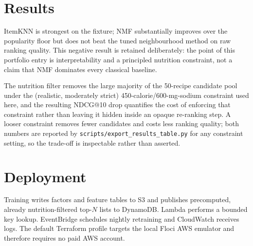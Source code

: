 \section{Results}
\label{sec:results}
\begin{table}[h]
\centering\scriptsize
\caption{Global temporal test results on the reproducible fixture.}

\end{table}

\begin{table}[h]
\centering\scriptsize
\caption{Nutrition filter impact on NMF (k=10, 50-recipe candidate pool).}

\end{table}

ItemKNN is strongest on the fixture; NMF substantially improves over the
popularity floor but does not beat the tuned neighbourhood method on raw
ranking quality. This negative result is retained deliberately: the point
of this portfolio entry is interpretability and a principled nutrition
constraint, not a claim that NMF dominates every classical baseline.

The nutrition filter removes the large majority of the 50-recipe candidate
pool under the (realistic, moderately strict) 450-calorie/600-mg-sodium
constraint used here, and the resulting NDCG@10 drop quantifies the cost of
enforcing that constraint rather than leaving it hidden inside an opaque
re-ranking step. A looser constraint removes fewer candidates and costs
less ranking quality; both numbers are reported by
\texttt{scripts/export\_results\_table.py} for any constraint setting, so
the trade-off is inspectable rather than asserted.

\section{Deployment}
Training writes factors and feature tables to S3 and publishes precomputed,
already nutrition-filtered top-$N$ lists to DynamoDB. Lambda performs a
bounded key lookup. EventBridge schedules nightly retraining and CloudWatch
receives logs. The default Terraform profile targets the local Floci AWS
emulator and therefore requires no paid AWS account.
